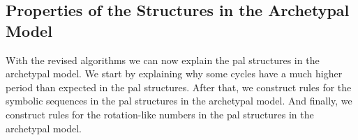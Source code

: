 \subsection{Properties of the  Structures in the Archetypal Model}
\label{sec:add.rules.pal}

With the revised algorithms we can now explain the \gls{pal} structures in the archetypal model.
We start by explaining why some cycles have a much higher period than expected in the \gls{pal} structures.
After that, we construct rules for the symbolic sequences in the \gls{pal} structures in the archetypal model.
And finally, we construct rules for the rotation-like numbers in the \gls{pal} structures in the archetypal model.




